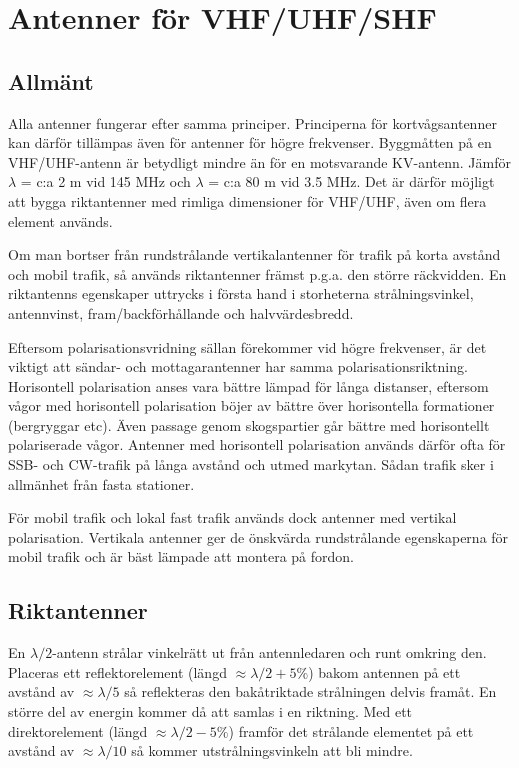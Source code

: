 \section{Antenner för VHF/UHF/SHF}

\subsection{Allmänt}

Alla antenner fungerar efter samma principer. Principerna för
kortvågsantenner kan därför tillämpas även för antenner för högre
frekvenser. Byggmåtten på en VHF/UHF-antenn är betydligt mindre än för
en motsvarande KV-antenn. Jämför \(\lambda\) = c:a 2 m vid 145 MHz och
\(\lambda\) = c:a 80 m vid 3.5 MHz. Det är därför möjligt att bygga
riktantenner med rimliga dimensioner för VHF/UHF, även om flera
element används.

Om man bortser från rundstrålande vertikalantenner för trafik på korta
avstånd och mobil trafik, så används riktantenner främst p.g.a. den
större räckvidden. En riktantenns egenskaper uttrycks i första hand i
storheterna strålningsvinkel, antennvinst, fram/backförhållande och
halvvärdesbredd.

Eftersom polarisationsvridning sällan förekommer vid högre frekvenser,
är det viktigt att sändar- och mottagarantenner har samma
polarisationsriktning.  Horisontell polarisation anses vara bättre
lämpad för långa distanser, eftersom vågor med horisontell
polarisation böjer av bättre över horisontella formationer (bergryggar
etc). Även passage genom skogspartier går bättre med horisontellt
polariserade vågor.  Antenner med horisontell polarisation används
därför ofta för SSB- och CW-trafik på långa avstånd och utmed
markytan. Sådan trafik sker i allmänhet från fasta stationer.

För mobil trafik och lokal fast trafik används dock antenner med
vertikal polarisation. Vertikala antenner ger de önskvärda
rundstrålande egenskaperna för mobil trafik och är bäst lämpade att
montera på fordon.

\subsection{Riktantenner}

En \(\lambda/2\)-antenn strålar vinkelrätt ut från antennledaren och
runt omkring den.  Placeras ett reflektorelement (längd
\(\approx\lambda/2 + 5\%\)) bakom antennen på ett avstånd av \(\approx
\lambda/5\) så reflekteras den bakåtriktade strålningen delvis
framåt. En större del av energin kommer då att samlas i en
riktning. Med ett direktorelement (längd \(\approx\lambda/2 - 5\%\))
framför det strålande elementet på ett avstånd av
\(\approx\lambda/10\) så kommer utstrålningsvinkeln att bli mindre.

